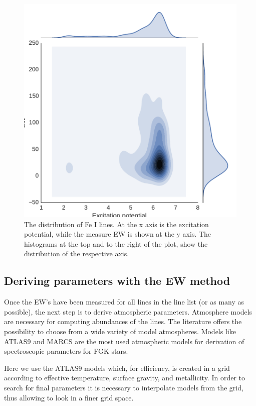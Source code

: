 \documentclass{aa}
\begin{document}
\begin{figure}[htpb]
    \centering
    \includegraphics[width=0.9\linewidth]{figures/EWvsEP_cut.pdf}
    \caption{The distribution of Fe I lines. At the x axis is the
    excitation potential, while the measure EW is shown at the y axis.
    The histograms at the top and to the right of the plot, show the
    distribution of the respective axis.}
    \label{fig:Fe1_after_recal}
\end{figure}



\subsection{Deriving parameters with the EW method}
\label{sec:deriving_parameters_with_the_ew_method}

Once the EW's have been measured for all lines in the line list (or as
many as possible), the next step is to derive atmospheric parameters.
Atmosphere models are necessary for computing abundances of the lines.
The literature offers the possibility to choose from a wide variety
of model atmospheres. Models like ATLAS9 \citep{kurucz1993} and
MARCS \citep{gustafson2008} are the most used atmospheric models for
derivation of spectroscopic parameters for FGK stars.

Here we use the ATLAS9 models which, for efficiency, is created in
a grid according to effective temperature, surface gravity, and
metallicity. In order to search for final parameters it is necessary to
interpolate models from the grid, thus allowing to look in a finer grid
space.
\end{document}
